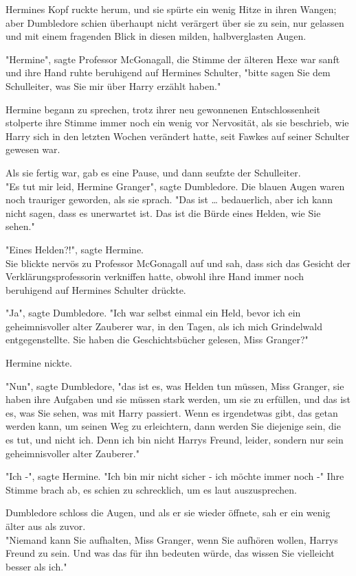 {Hermines Kopf ruckte herum, und sie spürte ein wenig Hitze in ihren Wangen; aber Dumbledore schien überhaupt nicht verärgert über sie zu sein, nur gelassen und mit einem fragenden Blick in diesen milden, halbverglasten Augen.

"Hermine", sagte Professor McGonagall, die Stimme der älteren Hexe war sanft und ihre Hand ruhte beruhigend auf Hermines Schulter, "bitte sagen Sie dem Schulleiter, was Sie mir über Harry erzählt haben."

Hermine begann zu sprechen, trotz ihrer neu gewonnenen Entschlossenheit stolperte ihre Stimme immer noch ein wenig vor Nervosität, als sie beschrieb, wie Harry sich in den letzten Wochen verändert hatte, seit Fawkes auf seiner Schulter gewesen war.

Als sie fertig war, gab es eine Pause, und dann seufzte der Schulleiter.\\ "Es tut mir leid, Hermine Granger", sagte Dumbledore. Die blauen Augen waren noch trauriger geworden, als sie sprach. "Das ist … bedauerlich, aber ich kann nicht sagen, dass es unerwartet ist. Das ist die Bürde eines Helden, wie Sie sehen."

"Eines Helden?!", sagte Hermine.\\ Sie blickte nervös zu Professor McGonagall auf und sah, dass sich das Gesicht der Verklärungsprofessorin verkniffen hatte, obwohl ihre Hand immer noch beruhigend auf Hermines Schulter drückte.

"Ja", sagte Dumbledore. "Ich war selbst einmal ein Held, bevor ich ein geheimnisvoller alter Zauberer war, in den Tagen, als ich mich Grindelwald entgegenstellte. Sie haben die Geschichtsbücher gelesen, Miss Granger?"

Hermine nickte.

"Nun", sagte Dumbledore, "das ist es, was Helden tun müssen, Miss Granger, sie haben ihre Aufgaben und sie müssen stark werden, um sie zu erfüllen, und das ist es, was Sie sehen, was mit Harry passiert. Wenn es irgendetwas gibt, das getan werden kann, um seinen Weg zu erleichtern, dann werden Sie diejenige sein, die es tut, und nicht ich. Denn ich bin nicht Harrys Freund, leider, sondern nur sein geheimnisvoller alter Zauberer."

"Ich -", sagte Hermine. "Ich bin mir nicht sicher - ich möchte immer noch -" Ihre Stimme brach ab, es schien zu schrecklich, um es laut auszusprechen.

Dumbledore schloss die Augen, und als er sie wieder öffnete, sah er ein wenig älter aus als zuvor.\\ "Niemand kann Sie aufhalten, Miss Granger, wenn Sie aufhören wollen, Harrys Freund zu sein. Und was das für ihn bedeuten würde, das wissen Sie vielleicht besser als ich."

}
